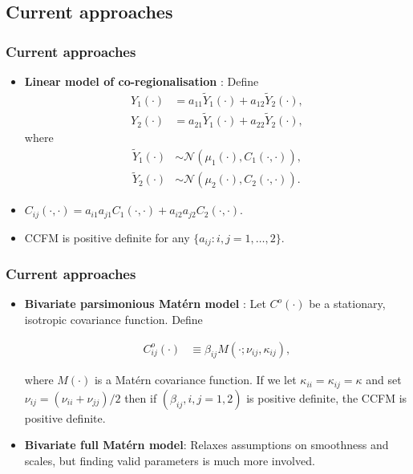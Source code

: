 \documentclass{beamer}
\newcommand{\Yt}{\widetilde{Y}}
\begin{document}

\subsection{Current approaches}

\begin{frame}
\frametitle{Current approaches}

\begin{itemize}

\item {\bf Linear model of co-regionalisation} \citep{Wackernagel1995}: Define
\begin{align}
    Y_1(\cdot) &= a_{11}\Yt_1(\cdot) + a_{12}\Yt_2(\cdot),\\
    Y_2(\cdot) &= a_{21}\Yt_1(\cdot) + a_{22}\Yt_2(\cdot),
\end{align}
where
\begin{align}
    \Yt_1(\cdot) &\sim \mathcal{N}(\mu_1(\cdot), C_{1}(\cdot,\cdot)),\\
    \Yt_2(\cdot) &\sim \mathcal{N}(\mu_2(\cdot), C_{2}(\cdot,\cdot)).
\end{align}

\item $C_{ij}(\cdot,\cdot) = a_{i1}a_{j1}C_{1}(\cdot,\cdot) + a_{i2}a_{j2}C_{2}(\cdot,\cdot)$.
\item CCFM is positive definite for any $\{a_{ij}: i,j = 1,\dots,2\}$. 
\end{itemize}
\end{frame}


\begin{frame}
\frametitle{Current approaches}

\begin{itemize}
\item {\bf Bivariate parsimonious Matérn model} \citep{Gneitingetal2010}: Let $C^o(\cdot)$ be a stationary, isotropic covariance function. Define
  
\begin{align}
    C_{ij}^o(\cdot) & \equiv \beta_{ij}M(\cdot; \nu_{ij}, \kappa_{ij}),
\end{align}

where $M(\cdot)$ is a Matérn covariance function. If we let $\kappa_{ii} = \kappa_{ij} = \kappa$ and set $\nu_{ij} = (\nu_{ii} + \nu_{jj})/2$ then if  $(\beta_{ij},i,j = 1,2)$ is positive definite, the CCFM is positive definite.\vfill
  
\item {\bf Bivariate full Matérn model}:  Relaxes assumptions on smoothness and scales, but finding valid parameters is much more involved.\vfill
\end{itemize}

\end{frame}
\end{document}
